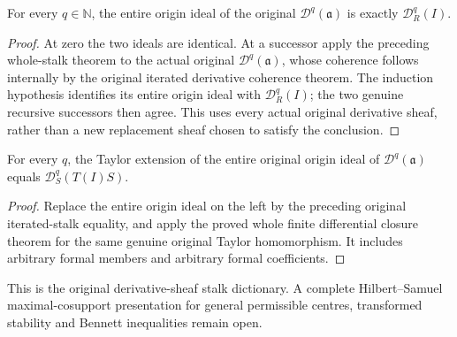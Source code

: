 \begin{theorem}
\label{hir:actual-original-all-derivative-sheaf-stalks}
\leanok
For every $q\in\mathbb N$, the entire origin ideal of the original
$\mathcal D^q(\mathfrak a)$ is exactly $\mathcal D_R^q(I)$.
\end{theorem}
\begin{proof}
At zero the two ideals are identical. At a successor apply the preceding
whole-stalk theorem to the actual original $\mathcal D^q(\mathfrak a)$,
whose coherence follows internally by the original iterated derivative
coherence theorem. The induction hypothesis identifies its entire origin
ideal with $\mathcal D_R^q(I)$; the two genuine recursive successors then
agree. This uses every actual original derivative sheaf, rather than a
new replacement sheaf chosen to satisfy the conclusion.
\end{proof}

\begin{theorem}
\label{hir:actual-original-derivative-sheaf-taylor-extension}
\leanok
For every $q$, the Taylor extension of the entire original origin ideal
of $\mathcal D^q(\mathfrak a)$ equals $\mathcal D_S^q(T(I)S)$.
\end{theorem}
\begin{proof}
Replace the entire origin ideal on the left by the preceding original
iterated-stalk equality, and apply the proved whole finite differential
closure theorem for the same genuine original Taylor homomorphism. It
includes arbitrary formal members and arbitrary formal coefficients.
\end{proof}

This is the original derivative-sheaf stalk dictionary. A complete
Hilbert--Samuel maximal-cosupport presentation for general permissible
centres, transformed stability and Bennett inequalities remain open.

